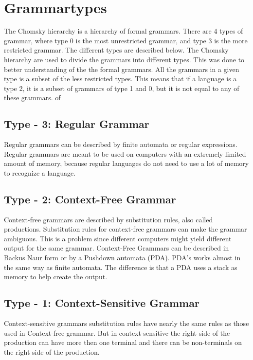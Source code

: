 \section{Grammartypes}
The Chomsky hierarchy is a hierarchy of formal grammars. There are 4 types of grammar, where type 0 is the most unrestricted grammar, and type 3 is the more restricted grammar. The different types are described below. The Chomsky hierarchy are used to divide the grammars into different types. This was done to better understanding of the the formal grammars. All the grammars in a given type is a subset of the less restricted types. This means that if a language is a type 2, it is a subset of grammars of type 1 and 0, but it is not equal to any of these grammars. of\citep{Chomsky}

\subsection{Type - 3: Regular Grammar}
Regular grammars can be described by finite automata or regular expressions. Regular grammars are meant to be used on computers with an extremely limited amount of memory, because regular languages do not need to use a lot of memory to recognize a language\citep{sipser}.

\subsection{Type - 2: Context-Free Grammar}
Context-free grammars are described by substitution rules, also called productions. Substitution rules for context-free grammars can make the grammar ambiguous.
This is a problem since different computers might yield different output for the same grammar.
Context-Free Grammars can be described in Backus Naur form or by a Pushdown automata (PDA). PDA's works almost in the same way as finite automata. The difference is that a PDA uses a stack as memory to help create the output\citep{sipser}. 

\subsection{Type - 1: Context-Sensitive Grammar}
Context-sensitive grammars substitution rules have nearly the same rules as those used in Context-free grammar. But in context-sensitive the right side of the production can have more then one terminal and there can be non-terminals on the right side of the production. 

